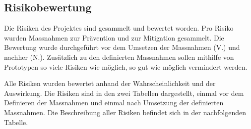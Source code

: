 \subsection{Risikobewertung}\label{risk}

Die Risiken des Projektes sind gesammelt und bewertet worden. Pro Risiko wurden Massnahmen zur Prävention und zur Mitigation gesammelt. Die Bewertung wurde durchgeführt vor dem Umsetzen der Massnahmen (V.) und nachher (N.).
Zusätzlich zu den definierten Massnahmen sollen mithilfe von Prototypen so viele Risiken wie möglich, so gut wie möglich vermindert werden. 

Alle Risiken wurden bewertet anhand der Wahrscheinlichkeit und der Auswirkung. 
Die Risiken sind in den zwei Tabellen dargestellt, einmal vor dem Definieren der Massnahmen und einmal nach Umsetzung der definierten Massnahmen. Die Beschreibung aller Risiken befindet sich in der nachfolgenden Tabelle.


